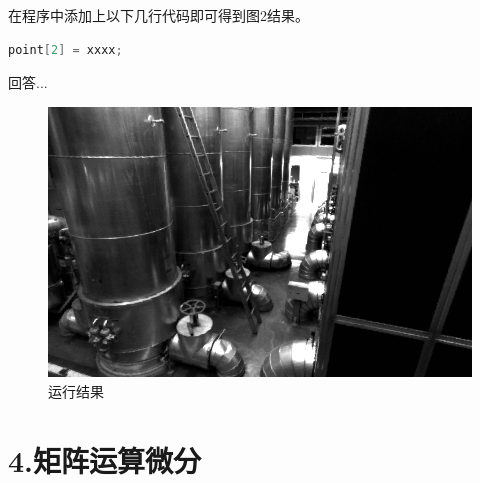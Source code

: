 \documentclass[
	12pt, %
]{fphw} %
\begin{document}
在程序中添加上以下几行代码即可得到图2结果。

\begin{lstlisting}[language=C++, caption=题3所添代码]
	point[2] = xxxx;	
\end{lstlisting}

回答...

\begin{figure}[h]
	\centering
	\includegraphics[width=0.9\columnwidth]{pic1.png} %
	\caption{运行结果}
\end{figure}

\clearpage
\section*{4.矩阵运算微分}
\end{document}
